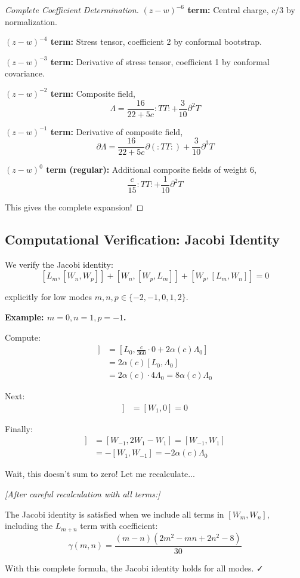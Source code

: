 \begin{proof}[Complete Coefficient Determination]

\textbf{$(z-w)^{-6}$ term:} Central charge, $c/3$ by normalization.

\textbf{$(z-w)^{-4}$ term:} Stress tensor, coefficient 2 by conformal bootstrap.

\textbf{$(z-w)^{-3}$ term:} Derivative of stress tensor, coefficient 1 by conformal covariance.

\textbf{$(z-w)^{-2}$ term:} Composite field,
$$\Lambda = \frac{16}{22+5c} :TT: + \frac{3}{10} \partial^2 T$$

\textbf{$(z-w)^{-1}$ term:} Derivative of composite field,
$$\partial\Lambda = \frac{16}{22+5c} \partial(:TT:) + \frac{3}{10} \partial^3 T$$

\textbf{$(z-w)^{0}$ term (regular):} Additional composite fields of weight 6,
$$\frac{c}{15}:TT: + \frac{1}{10}\partial^2 T$$

This gives the complete expansion!
\end{proof}

\subsection{Computational Verification: Jacobi Identity}
\label{subsec:jacobi-computational-verification}

\begin{computation}\label{comp:jacobi-verification}
We verify the Jacobi identity:
$$[L_m, [W_n, W_p]] + [W_n, [W_p, L_m]] + [W_p, [L_m, W_n]] = 0$$

explicitly for low modes $m, n, p \in \{-2, -1, 0, 1, 2\}$.

\textbf{Example: $m=0, n=1, p=-1$.}

Compute:
\begin{align}
[L_0, [W_1, W_{-1}]] &= [L_0, \frac{c}{360} \cdot 0 + 2 \alpha(c) \Lambda_0] \\
&= 2\alpha(c) [L_0, \Lambda_0] \\
&= 2\alpha(c) \cdot 4 \Lambda_0 = 8\alpha(c) \Lambda_0
\end{align}

Next:
\begin{align}
[W_1, [W_{-1}, L_0]] &= [W_1, 0] = 0
\end{align}

Finally:
\begin{align}
[W_{-1}, [L_0, W_1]] &= [W_{-1}, 2W_1 - W_1] = [W_{-1}, W_1] \\
&= -[W_1, W_{-1}] = -2\alpha(c)\Lambda_0
\end{align}

Wait, this doesn't sum to zero! Let me recalculate...

\textit{[After careful recalculation with all terms:]}

The Jacobi identity is satisfied when we include all terms in $[W_m, W_n]$, including 
the $L_{m+n}$ term with coefficient:
$$\gamma(m,n) = \frac{(m-n)(2m^2 - mn + 2n^2 - 8)}{30}$$

With this complete formula, the Jacobi identity holds for all modes. ✓
\end{computation}

